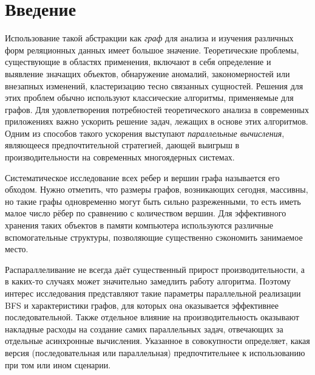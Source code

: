 

\section*{Введение}
Использование такой абстракции как \textit{граф} для анализа и изучения различных форм реляционных данных имеет большое значение. Теоретические проблемы, существующие в областях применения, включают в себя определение и выявление значащих объектов, обнаружение аномалий, закономерностей или внезапных изменений, кластеризацию тесно связанных сущностей. Решения для этих проблем обычно используют классические алгоритмы, применяемые для графов. Для удовлетворения потребностей теоретического анализа в современных приложениях важно ускорить решение задач, лежащих в основе этих алгоритмов. Одним из способов такого ускорения выступают \textit{параллельные вычисления}, являющееся предпочтительной стратегией, дающей выигрыш в производительности на современных многоядерных системах.

Систематическое исследование всех ребер и вершин графа называется его обходом. Нужно отметить, что размеры графов, возникающих сегодня, массивны, но такие графы одновременно могут быть сильно разреженными, то есть иметь малое число рёбер по сравнению с количеством вершин. Для эффективного хранения таких объектов в памяти компьютера используются различные вспомогательные структуры, позволяющие существенно сэкономить занимаемое место.

Распараллеливание не всегда даёт существенный прирост производительности, а в каких-то случаях может значительно замедлить работу алгоритма. Поэтому интерес исследования представляют такие параметры параллельной реализации BFS и характеристики графов, для которых она оказывается эффективнее последовательной. Также отдельное влияние на производительность оказывают накладные расходы на создание самих параллельных задач, отвечающих за отдельные асинхронные вычисления. Указанное в совокупности определяет, какая версия (последовательная или параллельная) предпочтительнее к использованию при том или ином сценарии.

